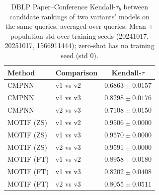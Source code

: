 \documentclass{article}
\begin{document}
\begin{table}[t]
\centering
\small
\begin{tabular}{||l||l||c||}
\hline
\textbf{Method} & \textbf{Comparison} & \textbf{Kendall-$\tau$} \\
\hline\hline
CMPNN & v1 vs v2 & $0.6863 \pm 0.0157$ \\
\hline
CMPNN & v1 vs v3 & $0.8298 \pm 0.0176$ \\
\hline
CMPNN & v2 vs v3 & $0.7108 \pm 0.0150$ \\
\hline
\hline
MOTIF (ZS) & v1 vs v2 & $0.9506 \pm 0.0000$ \\
\hline
MOTIF (ZS) & v1 vs v3 & $0.9570 \pm 0.0000$ \\
\hline
MOTIF (ZS) & v2 vs v3 & $0.9591 \pm 0.0000$ \\
\hline
\hline
MOTIF (FT) & v1 vs v2 & $0.8958 \pm 0.0180$ \\
\hline
MOTIF (FT) & v1 vs v3 & $0.8202 \pm 0.0408$ \\
\hline
MOTIF (FT) & v2 vs v3 & $0.8055 \pm 0.0511$ \\
\hline
\end{tabular}
\caption{DBLP Paper--Conference Kendall-$\tau_b$ between candidate rankings of two variants' models on the same queries, averaged over queries. Mean $\pm$ population std over training seeds (20241017, 20251017, 1566911444); zero-shot has no training seed (std 0). }
\label{tab:dblp_paper_conference_seed_invariance}
\end{table}
\end{document}
